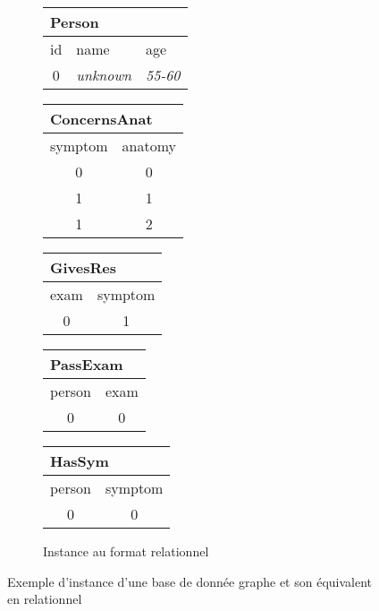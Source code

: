 \begin{figure}
\begin{subfigure}{\linewidth}
\begin{adjustbox}{varwidth=\linewidth}
\begin{tabular}{c|l}
            \end{tabular}
            \quad
            \begin{tabular}{c|l|l}
                \multicolumn{2}{l}{\textbf{Person}} \\
                \hline
                \hline
                id & name           & age           \\
                \hline
                0  & \emph{unknown} & \emph{55-60}  \\
            \end{tabular}
            \quad
            \begin{tabular}{c|c}
                \multicolumn{2}{l}{\textbf{ConcernsAnat}} \\
                \hline
                \hline
                symptom & anatomy                         \\
                \hline
                0       & 0                               \\
                1       & 1                               \\
                1       & 2
            \end{tabular}
            \quad
            \begin{tabular}{c|c}
                \multicolumn{2}{l}{\textbf{GivesRes}} \\
                \hline
                \hline
                exam & symptom                        \\
                \hline
                0    & 1                              \\
            \end{tabular}
            \quad
            \begin{tabular}{c|c}
                \multicolumn{2}{l}{\textbf{PassExam}} \\
                \hline
                \hline
                person & exam                         \\
                \hline
                0      & 0                            \\
            \end{tabular}
            \quad
            \begin{tabular}{c|c}
                \multicolumn{2}{l}{\textbf{HasSym}} \\
                \hline
                \hline
                person & symptom                    \\
                \hline
                0      & 0                          \\
            \end{tabular}
        \end{adjustbox}
        \caption{Instance au format relationnel}
    \end{subfigure}
    \caption{Exemple d'instance d'une base de donnée graphe et son équivalent en relationnel}
    \label{fig:update:pre:graph}
\end{figure}


